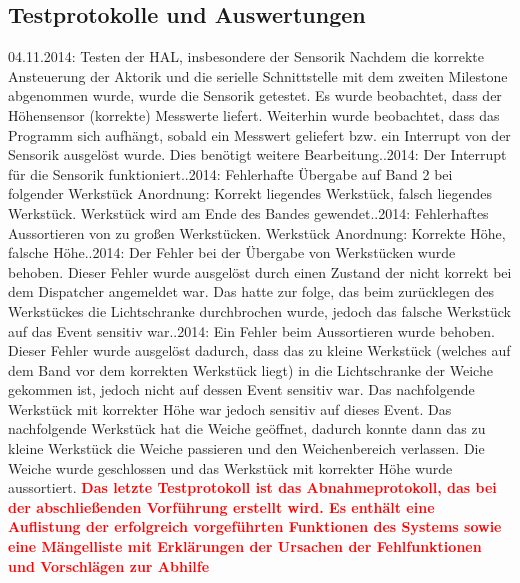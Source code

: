 \documentclass[oneside,a4paper,titlepage]{scrartcl}              %
\begin{document}
\subsection{Testprotokolle und Auswertungen}
04.11.2014: Testen der HAL, insbesondere der Sensorik\newline
Nachdem die korrekte Ansteuerung der Aktorik und die serielle Schnittstelle mit dem zweiten Milestone abgenommen wurde, wurde die Sensorik getestet. Es wurde beobachtet, dass der Höhensensor (korrekte) Messwerte liefert. Weiterhin wurde beobachtet, dass das Programm sich aufhängt, sobald ein Messwert geliefert bzw. ein Interrupt von der Sensorik ausgelöst wurde. Dies benötigt weitere Bearbeitung.\newline{}.2014: Der Interrupt für die Sensorik funktioniert.\newline{}.2014: Fehlerhafte Übergabe auf Band 2 bei folgender Werkstück Anordnung: Korrekt liegendes Werkstück, falsch liegendes Werkstück. Werkstück wird am Ende des Bandes gewendet.\newline{}.2014: Fehlerhaftes Aussortieren von zu großen Werkstücken. Werkstück Anordnung: Korrekte Höhe, falsche Höhe.\newline{}.2014: Der Fehler bei der Übergabe von Werkstücken wurde behoben. Dieser Fehler wurde ausgelöst durch einen Zustand der nicht korrekt bei dem Dispatcher
angemeldet war. Das hatte zur folge, das beim zurücklegen des Werkstückes die Lichtschranke durchbrochen wurde, jedoch das falsche Werkstück auf das Event sensitiv war.\newline{}.2014: Ein Fehler beim Aussortieren wurde behoben. Dieser Fehler wurde ausgelöst dadurch, dass das zu kleine Werkstück (welches auf dem Band vor dem korrekten Werkstück liegt)
in die Lichtschranke der Weiche gekommen ist, jedoch nicht auf dessen Event sensitiv war. Das nachfolgende Werkstück mit korrekter Höhe war jedoch sensitiv auf dieses Event.
Das nachfolgende Werkstück hat die Weiche geöffnet, dadurch konnte dann das zu kleine Werkstück die Weiche passieren und den Weichenbereich verlassen. Die Weiche wurde geschlossen
und das Werkstück mit korrekter Höhe wurde aussortiert.
\newline\newline\textcolor{red}{\textbf{Das letzte Testprotokoll ist das Abnahmeprotokoll, das bei der abschließenden Vorführung erstellt wird. Es enthält eine Auflistung der erfolgreich vorgeführten Funktionen des Systems sowie eine Mängelliste mit Erklärungen der Ursachen der Fehlfunktionen und Vorschlägen zur Abhilfe}}
\end{document}
